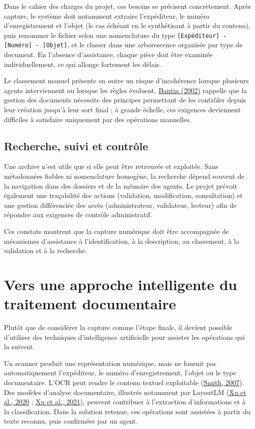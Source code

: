 \documentclass[12pt,a4paper]{report}
\newcommand{\citer}[2]{\hyperref[ref:#1]{#2}}
\begin{document}
Dans le cahier des charges du projet, ces besoins se précisent concrètement. Après capture, le système doit notamment extraire l'expéditeur, le numéro d'enregistrement et l'objet (le cas échéant en le synthétisant à partir du contenu), puis renommer le fichier selon une nomenclature du type \texttt{[Expéditeur] - [Numéro] - [Objet]}, et le classer dans une arborescence organisée par type de document. En l'absence d'assistance, chaque pièce doit être examinée individuellement, ce qui allonge fortement les délais.

Le classement manuel présente en outre un risque d'incohérence lorsque plusieurs agents interviennent ou lorsque les règles évoluent. \citer{bantin2002}{Bantin (2002)} rappelle que la gestion des documents nécessite des principes permettant de les contrôler depuis leur création jusqu'à leur sort final ; à grande échelle, ces exigences deviennent difficiles à satisfaire uniquement par des opérations manuelles.

\subsection{Recherche, suivi et contrôle}
Une archive n'est utile que si elle peut être retrouvée et exploitée. Sans métadonnées fiables ni nomenclature homogène, la recherche dépend souvent de la navigation dans des dossiers et de la mémoire des agents. Le projet prévoit également une traçabilité des actions (validation, modification, consultation) et une gestion différenciée des accès (administrateur, validateur, lecteur) afin de répondre aux exigences de contrôle administratif.

Ces constats montrent que la capture numérique doit être accompagnée de mécanismes d'assistance à l'identification, à la description, au classement, à la validation et à la recherche.

\section{Vers une approche intelligente du traitement documentaire}
Plutôt que de considérer la capture comme l'étape finale, il devient possible d'utiliser des techniques d'intelligence artificielle pour assister les opérations qui la suivent.

Un scanner produit une représentation numérique, mais ne fournit pas automatiquement l'expéditeur, le numéro d'enregistrement, l'objet ou le type documentaire. L'OCR peut rendre le contenu textuel exploitable (\citer{smith2007}{Smith, 2007}). Des modèles d'analyse documentaire, illustrés notamment par LayoutLM (\citer{xu2020}{Xu et al., 2020} ; \citer{xu2021}{Xu et al., 2021}), peuvent contribuer à l'extraction d'informations et à la classification. Dans la solution retenue, ces opérations sont assistées à partir du texte reconnu, puis confirmées par un agent.
\end{document}
